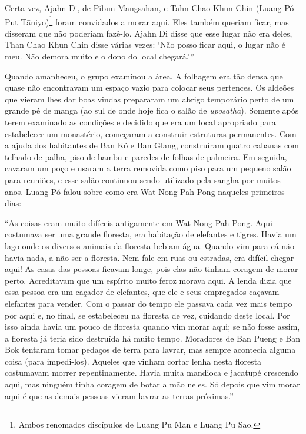 Certa vez, Ajahn Di, de Pibun Mangsahan, e Tahn Chao Khun Chin (Luang Pó
Put Tāniyo)\footnote{Ambos renomados discípulos de Luang Pu Man e Luang
  Pu Sao.} foram convidados a morar aqui. Eles também queriam ficar, mas
disseram que não poderiam fazê-lo. Ajahn Di disse que esse lugar não era
deles, Than Chao Khun Chin disse várias vezes: `Não posso ficar aqui, o
lugar não é meu. Não demora muito e o dono do local chegará.'\thinspace ''

Quando amanheceu, o grupo examinou a área. A folhagem era tão densa que
quase não encontravam um espaço vazio para colocar seus pertences. Os
aldeões que vieram lhes dar boas vindas prepararam um abrigo temporário
perto de um grande pé de manga (ao sul de onde hoje fica o salão de
\emph{uposatha}). Somente após terem examinado as condições e decidido
que era um local apropriado para estabelecer um monastério, começaram a
construir estruturas permanentes. Com a ajuda dos habitantes de Ban Kó e
Ban Glang, construíram quatro cabanas com telhado de palha, piso de
bambu e paredes de folhas de palmeira. Em seguida, cavaram um poço e
usaram a terra removida como piso para um pequeno salão para reuniões, e
esse salão continuou sendo utilizado pela sangha por muitos anos. Luang
Pó falou sobre como era Wat Nong Pah Pong naqueles primeiros dias:

``As coisas eram muito difíceis antigamente em Wat Nong Pah Pong. Aqui
costumava ser uma grande floresta, era habitação de elefantes e tigres.
Havia um lago onde os diversos animais da floresta bebiam água. Quando
vim para cá não havia nada, a não ser a floresta. Nem fale em ruas ou
estradas, era difícil chegar aqui! As casas das pessoas ficavam longe,
pois elas não tinham coragem de morar perto. Acreditavam que um espírito
muito feroz morava aqui. A lenda dizia que essa pessoa era um caçador de
elefantes, que ele e seus empregados caçavam elefantes para vender. Com
o passar do tempo ele passava cada vez mais tempo por aqui e, no final,
se estabeleceu na floresta de vez, cuidando deste local. Por isso ainda
havia um pouco de floresta quando vim morar aqui; se não fosse assim, a
floresta já teria sido destruída há muito tempo. Moradores de Ban Pueng
e Ban Bok tentaram tomar pedaços de terra para lavrar, mas sempre
acontecia alguma coisa (para impedi-los). Aqueles que vinham cortar
lenha nesta floresta costumavam morrer repentinamente. Havia muita
mandioca e jacatupé crescendo aqui, mas ninguém tinha coragem de botar a
mão neles. Só depois que vim morar aqui é que as demais pessoas vieram
lavrar as terras próximas.''

